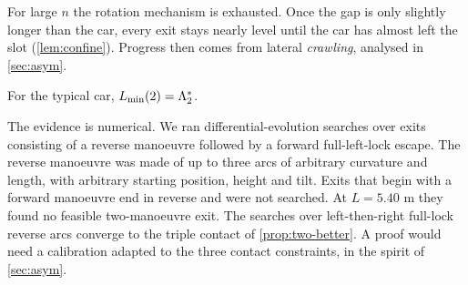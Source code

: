 For large $n$ the rotation mechanism is exhausted.
Once the gap is only slightly longer than the car, every exit stays nearly level until the car has almost left the slot (\cref{lem:confine}).
Progress then comes from lateral \emph{crawling}, analysed in \cref{sec:asym}.

\begin{conjecture}\label{conj:two}
For the typical car, $L_{\min}(2)=\Lambda_2^*$.
\end{conjecture}

The evidence is numerical.
We ran differential-evolution searches over exits consisting of a reverse manoeuvre followed by a forward full-left-lock escape.
The reverse manoeuvre was made of up to three arcs of arbitrary curvature and length, with arbitrary starting position, height and tilt.
Exits that begin with a forward manoeuvre end in reverse and were not searched.
At $L=5.40$ m they found no feasible two-manoeuvre exit.
The searches over left-then-right full-lock reverse arcs converge to the triple contact of \cref{prop:two-better}.
A proof would need a calibration adapted to the three contact constraints, in the spirit of \cref{sec:asym}.
